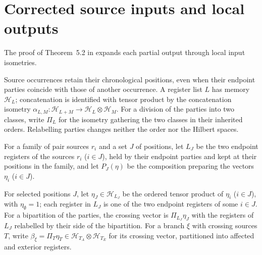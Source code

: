 \section{Corrected source inputs and local outputs}
\label{sec:peps_corrected_input_frames}

The proof of Theorem~5.2 in \cite[proof of Theorem~5.2]{OpenAI2026PolynomialPEPS} expands each partial output through local input isometries.

Source occurrences retain their chronological positions, even when their
endpoint parties coincide with those of another occurrence.
A register list $L$ has memory $\mathcal H_L$; concatenation is identified
with tensor product by the concatenation isometry
$\alpha_{L,M}\colon\mathcal H_{L+M}\to\mathcal H_L\otimes\mathcal H_M$.
For a division of the parties into two classes, write $\Pi_L$ for the
isometry gathering the two classes in their inherited orders.
Relabelling parties changes neither the order nor the Hilbert spaces.

\begin{definition}
    \label{def:peps_ordered_source_positions}
    \leanok
    For a family of pair sources $r_i$ and a set $J$ of positions, let $L_J$
    be the two endpoint registers of the sources $r_i$ ($i\in J$), held by
    their endpoint parties and kept at their positions in the family, and let
    $P_J(\eta)$ be the composition preparing the vectors $\eta_i$ ($i\in J$).
\end{definition}

\begin{definition}
    \label{def:peps_free_source_vector}
    \leanok
    For selected positions $J$, let $\eta_J\in\mathcal H_{L_J}$ be the ordered
    tensor product of $\eta_i$ ($i\in J$), with $\eta_\emptyset=1$; each register in $L_J$ is one of the two endpoint registers of some $i\in J$.
    For a bipartition of the parties, the crossing vector is $\Pi_{L_J}\eta_J$ with the registers of $L_J$ relabelled by their side of the bipartition.
    For a branch $\xi$ with crossing sources $T$, write
    $\beta_\xi=\Pi_T\eta_T\in\mathcal H_{T_A}\otimes\mathcal H_{T_E}$ for its crossing
    vector, partitioned into affected and exterior registers.
\end{definition}

